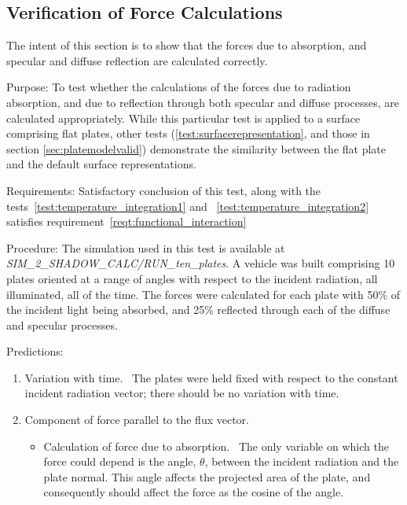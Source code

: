 \subsection{Verification of Force Calculations}\label{sec:verifforces}
The intent of this section is to show that the forces due to absorption, and
    specular and diffuse reflection are calculated correctly.
  \label{test:Fasd}
  \begin{description}
  \item{Purpose:}\newline
    To test whether the calculations of the forces due to radiation absorption,
    and due to reflection through both specular and diffuse processes, are
    calculated appropriately.  While this particular test is applied to a surface comprising flat plates, other tests (\vref{test:surfacerepresentation}, and those in section \vref{sec:platemodelvalid}) demonstrate the similarity between the flat plate and the default surface representations.
  \item{Requirements:}\newline
    Satisfactory conclusion of this test, along with the tests~\ref{test:temperature_integration1} and ~\ref{test:temperature_integration2} satisfies requirement~\ref{reqt:functional_interaction}
  \item{Procedure:}\newline
    The simulation used in this test is available at \textit{SIM\_2\_SHADOW\_CALC/RUN\_ten\_plates}.
    A vehicle was built comprising 10 plates oriented at a range of angles with
    respect to the incident radiation, all illuminated, all of the time.  The
    forces were calculated for each plate with 50\% of the incident light being
    absorbed, and 25\% reflected through each of the diffuse and specular
    processes.
  \item{Predictions:}\newline
    \begin{enumerate}
    \item{Variation with time.}\ \newline
      The plates were held fixed with respect to the constant incident
      radiation vector; there should be no variation with time.
    \item{Component of force parallel to the flux vector.}
      \begin{itemize}
      \item{Calculation of force due to absorption.}\ \newline
        The only variable on which the force could depend is the angle,
				$\theta$, between
        the incident radiation and the plate normal.  This angle affects the
        projected area of the plate, and consequently should affect the force as
        the cosine of the angle.


\end{itemize}
\end{enumerate}
\end{description}
